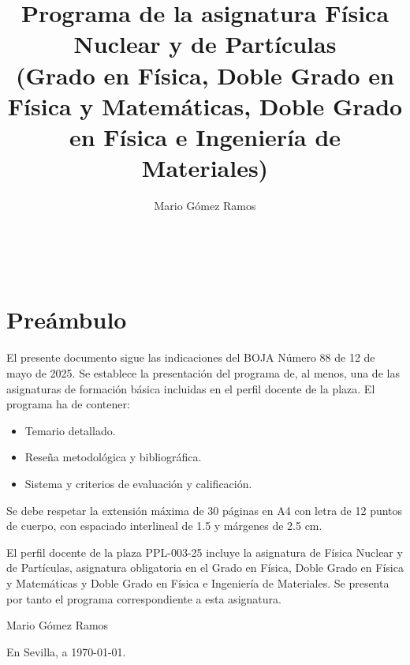 \documentclass[a4paper,12pt,twoside]{article}
\begin{document}

\title{\textbf{Programa de la asignatura F\'isica Nuclear y de Part\'iculas} \\ (Grado en F\'isica, Doble Grado en F\'isica y Matem\'aticas, Doble Grado en F\'isica e Ingenier\'ia de Materiales)}
\author{Mario G\'omez Ramos}
\maketitle

\thispagestyle{empty}
\newpage
\thispagestyle{empty}  

~ \\


\newpage

\section*{Preámbulo}

El presente documento sigue las indicaciones del BOJA Número 88 de 12 de mayo de 2025. Se establece la presentación del programa de, al menos, una de las asignaturas de formación básica incluidas en el perfil docente de la plaza. El programa ha de contener: 
\begin{itemize}
\item Temario detallado.

\item Reseña metodológica y bibliográfica.

\item Sistema y criterios de evaluación y calificación.
\end{itemize}
Se debe respetar la extensión máxima de 30 páginas en A4 con letra de 12 puntos de cuerpo, con espaciado interlineal de 1.5 y márgenes de 2.5 cm.

El perfil docente de la plaza PPL-003-25 incluye la asignatura de Física Nuclear y de Part\'iculas, asignatura obligatoria en el Grado en F\'isica, Doble Grado en F\'isica y Matem\'aticas y Doble Grado en F\'isica e Ingenier\'ia de Materiales. Se presenta por tanto el programa correspondiente a esta asignatura.
\vfill


Mario G\'omez Ramos

En Sevilla, a \today.

~ \\
\end{document}
